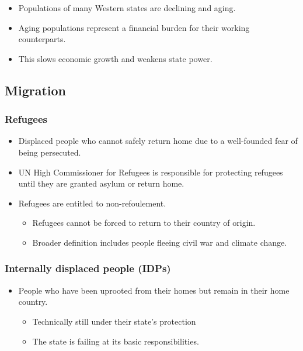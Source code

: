 \documentclass[
]{book}
\begin{document}
\begin{itemize}
\item
  Populations of many Western states are declining and aging.
\item
  Aging populations represent a financial burden for their working counterparts.
\item
  This slows economic growth and weakens state power.
\end{itemize}

\hypertarget{migration}{%
\subsection{Migration}\label{migration}}

\hypertarget{refugees}{%
\subsubsection{Refugees}\label{refugees}}

\begin{itemize}
\item
  Displaced people who cannot safely return home due to a well-founded fear of being persecuted.
\item
  UN High Commissioner for Refugees is responsible for protecting refugees until they are granted asylum or return home.
\item
  Refugees are entitled to non-refoulement.

  \begin{itemize}
  \item
    Refugees cannot be forced to return to their country of origin.
  \item
    Broader definition includes people fleeing civil war and climate change.
  \end{itemize}
\end{itemize}

\hypertarget{internally-displaced-people-idps}{%
\subsubsection{Internally displaced people (IDPs)}\label{internally-displaced-people-idps}}

\begin{itemize}
\item
  People who have been uprooted from their homes but remain in their home country.

  \begin{itemize}
  \item
    Technically still under their state's protection
  \item
    The state is failing at its basic responsibilities.
  \end{itemize}
\end{itemize}
\end{document}
